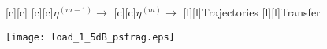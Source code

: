 \documentclass{article}
\begin{document}
\begin{figure}[htb]
  \begin{center}

        [c][c]{}
        [c][c]{$\eta^{(m-1)} \rightarrow$}
        [c][c]{$\eta^{(m)} \rightarrow$}
        [l][l]{Trajectories}
        [l][l]{Transfer}
        

    \texttt{[image: load\_1\_5dB\_psfrag.eps]}
    \end{center}
\end{figure}
\end{document}
